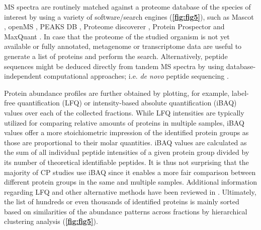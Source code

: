 MS spectra are routinely matched against a proteome database of the species of interest by using a variety of software/search engines (\textbf{\autoref{fig:fig5}}), such as Mascot \cite{Perkins_1999}, openMS \cite{Rost_2016}, PEAKS DB \cite{Zhang_2012}, Proteome discoverer \cite{Orsburn_2021}, Protein Prospector \cite{Chalkley_2005} and MaxQuant \cite{Tyanova_2016a}. In case that the proteome of the studied organism is not yet available or fully annotated, metagenome or transcriptome data are useful to generate a list of proteins and perform the search. Alternatively, peptide sequences might be deduced directly from tandem MS spectra by using database-independent computational approaches; i.e. \emph{de novo} peptide sequencing \cite{Tran_2017}.

Protein abundance profiles are further obtained by plotting, for example, label-free quantification (LFQ) \cite{Cox_2014} or intensity-based absolute quantification (iBAQ) \cite{Schwanhausser_2011, Tyanova_2016a} values over each of the collected fractions. While LFQ intensities are typically utilized for comparing relative amounts of proteins in multiple samples, iBAQ values offer a more stoichiometric impression of the identified protein groups as those are proportional to their molar quantities. iBAQ values are calculated as the sum of all individual peptide intensities of a given protein group divided by its number of theoretical identifiable peptides. It is thus not surprising that the majority of CP studies use iBAQ since it enables a more fair comparison between different protein groups in the same and multiple samples. Additional information regarding LFQ and other alternative methods have been reviewed in \cite{Fabre_2014, Wittig_2021}. Ultimately, the list of hundreds or even thousands of identified proteins is mainly sorted based on similarities of the abundance patterns across fractions by hierarchical clustering analysis (\textbf{\autoref{fig:fig5}}). \clearpage
